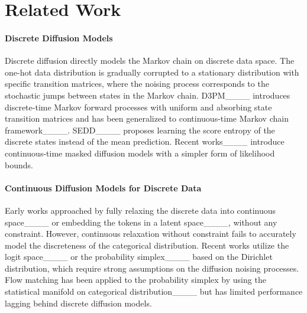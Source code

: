 \section{Related Work}
\paragraph{Discrete Diffusion Models}
Discrete diffusion directly models the Markov chain on discrete data space. The one-hot data distribution is gradually corrupted to a stationary distribution with specific transition matrices, where the noising process corresponds to the stochastic jumps between states in the Markov chain.
D3PM____ introduces discrete-time Markov forward processes with uniform and absorbing state transition matrices and has been generalized to continuous-time Markov chain framework____.
SEDD____ proposes learning the score entropy of the discrete states instead of the mean prediction. 
Recent works____ introduce continuous-time masked diffusion models with a simpler form of likelihood bounds.




\paragraph{Continuous Diffusion Models for Discrete Data}
Early works approached by fully relaxing the discrete data into continuous space____ or embedding the tokens in a latent space____, without any constraint.
However, continuous relaxation without constraint fails to accurately model the discreteness of the categorical distribution.
Recent works utilize the logit space____ or the probability simplex____ based on the Dirichlet distribution, which require strong assumptions on the diffusion noising processes.
Flow matching has been applied to the probability simplex by using the statistical manifold on categorical distribution____ but has limited performance lagging behind discrete diffusion models.


